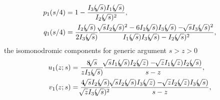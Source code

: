 \documentclass[10pt,reqno]{amsart}
\theoremstyle{plain}
\theoremstyle{definition}
\theoremstyle{remark}
\begin{document}
\begin{align}
 p_1(s/4) & = 1-\frac{I_{3}({ \hspace{-0.5pt} \sqrt[]{{s}}})I_{1}({ \hspace{-0.5pt} \sqrt[]{{s}}})}{I_{2}({ \hspace{-0.5pt} \sqrt[]{{s}}})^2},
\\
 q_1(s/4) & = \frac{I_{2}({ \hspace{-0.5pt} \sqrt[]{{s}}})}{2I_{3}({ \hspace{-0.5pt} \sqrt[]{{s}}})}
        \frac{{ \hspace{-0.5pt} \sqrt[]{{s}}} I_{2}({ \hspace{-0.5pt} \sqrt[]{{s}}})^2-6 I_{2}({ \hspace{-0.5pt} \sqrt[]{{s}}}) I_{3}({ \hspace{-0.5pt} \sqrt[]{{s}}})-{ \hspace{-0.5pt} \sqrt[]{{s}}} I_{3}({ \hspace{-0.5pt} \sqrt[]{{s}}})^2}
             {I_{1}({ \hspace{-0.5pt} \sqrt[]{{s}}}) I_{3}({ \hspace{-0.5pt} \sqrt[]{{s}}})-I_{2}({ \hspace{-0.5pt} \sqrt[]{{s}}})^2},
\end{align}
the isomonodromic components for generic argument $ s>z>0 $ 
\begin{align}
  u_1(z;s)& = \frac{8{ \hspace{-0.5pt} \sqrt[]{{s}}}}{z I_{3}({ \hspace{-0.5pt} \sqrt[]{{s}}})}\frac{{ \hspace{-0.5pt} \sqrt[]{{s}}}I_{1}({ \hspace{-0.5pt} \sqrt[]{{s}}}) I_{2}({ \hspace{-0.5pt} \sqrt[]{{z}}})- { \hspace{-0.5pt} \sqrt[]{{z}}}I_{1}({ \hspace{-0.5pt} \sqrt[]{{z}}}) I_{2}({ \hspace{-0.5pt} \sqrt[]{{s}}})}{s-z} ,
\\
  v_1(z;s)& = \frac{4{ \hspace{-0.5pt} \sqrt[]{{s}}}I_{2}({ \hspace{-0.5pt} \sqrt[]{{s}}})}{{ \hspace{-0.5pt} \sqrt[]{{z}}}I_{3}({ \hspace{-0.5pt} \sqrt[]{{s}}})^2}\frac{{ \hspace{-0.5pt} \sqrt[]{{s}}}I_{2}({ \hspace{-0.5pt} \sqrt[]{{s}}}) I_{3}({ \hspace{-0.5pt} \sqrt[]{{z}}})- { \hspace{-0.5pt} \sqrt[]{{z}}}I_{2}({ \hspace{-0.5pt} \sqrt[]{{z}}}) I_{3}({ \hspace{-0.5pt} \sqrt[]{{s}}})}{s-z} ,
\end{align}
\end{document}
